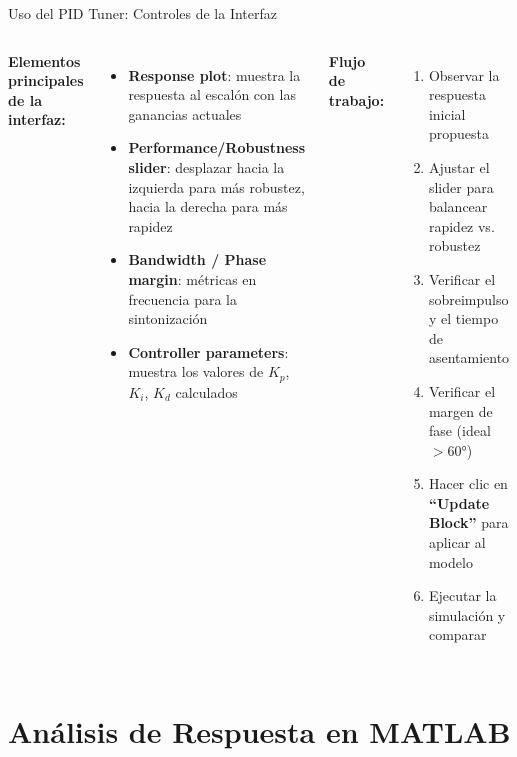 \documentclass[aspectratio=169,xcolor=dvipsnames]{beamer}
\begin{document}
\begin{frame}{Uso del PID Tuner: Controles de la Interfaz}
    \footnotesize
    \begin{columns}
        \textbf{Elementos principales de la interfaz:}
        \begin{itemize}
            \item \textbf{Response plot}: muestra la respuesta al escalón con las ganancias actuales
            \item \textbf{Performance/Robustness slider}: desplazar hacia la izquierda para más robustez, hacia la derecha para más rapidez
            \item \textbf{Bandwidth / Phase margin}: métricas en frecuencia para la sintonización
            \item \textbf{Controller parameters}: muestra los valores de $K_p$, $K_i$, $K_d$ calculados
        \end{itemize}
        \textbf{Flujo de trabajo:}
        \begin{enumerate}
            \item Observar la respuesta inicial propuesta
            \item Ajustar el slider para balancear rapidez vs. robustez
            \item Verificar el sobreimpulso y el tiempo de asentamiento
            \item Verificar el margen de fase (ideal $> 60°$)
            \item Hacer clic en \textbf{``Update Block''} para aplicar al modelo
            \item Ejecutar la simulación y comparar
        \end{enumerate}
    \end{columns}
\end{frame}

\section{Análisis de Respuesta en MATLAB}
\end{document}

